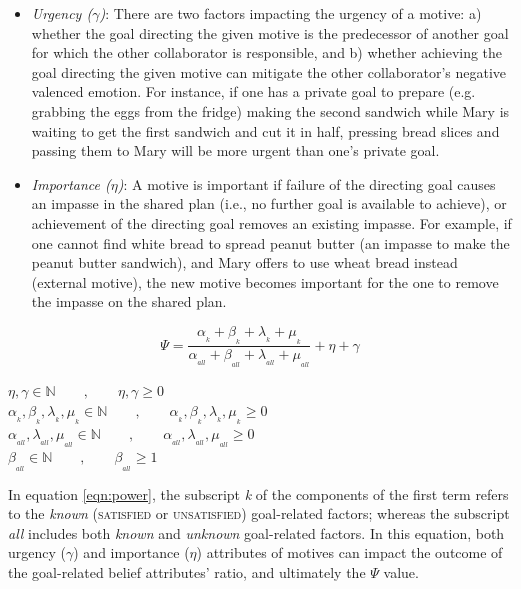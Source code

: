 \documentclass{article}
\begin{document}
\begin{itemize}[leftmargin=2pt]
  \setlength\itemsep{1mm}
  \item \textit{Urgency ($\gamma$)}: There are two factors impacting the urgency
  of a motive: a) whether the goal directing the given motive is the predecessor of
  another goal for which the other collaborator is responsible, and b) whether
  achieving the goal directing the given motive can mitigate the other
  collaborator's negative valenced emotion. For instance, if one has a private
  goal to prepare (e.g. grabbing the eggs from the fridge) making the second
  sandwich while Mary is waiting to get the first sandwich and cut it in half,
  pressing bread slices and passing them to Mary will be more urgent than one's
  private goal.
  \item \textit{Importance ($\eta$)}: A motive is important if failure of the
  directing goal causes an impasse in the shared plan (i.e., no further goal is
  available to achieve), or achievement of the directing goal removes an
  existing impasse. For example, if one cannot find white bread to spread peanut
  butter (an impasse to make the peanut butter sandwich), and Mary offers to use
  wheat bread instead (external motive), the new motive becomes important for
  the one to remove the impasse on the shared plan.
\end{itemize}

\vspace*{-4mm}
\begin{equation}
    \Psi = \frac{\alpha_{_k} + \beta_{_k} + \lambda_{_k} +
    \mu_{_k}}{\alpha_{_{all}} + \beta_{_{all}} + \lambda_{_{all}} +
    \mu_{_{all}}} + \eta + \gamma
    \label{eqn:power}
\end{equation}

\vspace*{1mm}
\begin{center} 
    $\eta, \gamma \in \mathbb{N} \qquad,\qquad \eta, \gamma \geq 0$\\
    $\alpha_{_k}, \beta_{_k}, \lambda_{_k}, \mu_{_k} \in \mathbb{N}
    \qquad,\qquad \alpha_{_k}, \beta_{_k}, \lambda_{_k}, \mu_{_k} \geq 0$\\
    $\alpha_{_{all}}, \lambda_{_{all}}, \mu_{_{all}} \in \mathbb{N}
    \qquad,\qquad \alpha_{_{all}}, \lambda_{_{all}}, \mu_{_{all}} \geq 0$\\
    $\beta_{_{all}} \in \mathbb{N} \qquad,\qquad \beta_{_{all}} \geq 1$
\end{center}

In equation \ref{eqn:power}, the subscript \textit{k} of the components of
the first term refers to the \textit{known} (\textsc{satisfied} or
\textsc{unsatisfied}) goal-related factors; whereas the subscript \textit{all}
includes both \textit{known} and \textit{unknown} goal-related factors. In this
equation, both urgency ($\gamma$) and importance ($\eta$) attributes of motives
can impact the outcome of the goal-related belief attributes' ratio, and
ultimately the $\Psi$ value.
\end{document}
